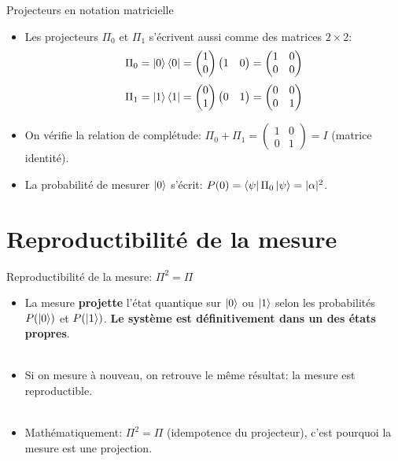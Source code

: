 \documentclass[aspectratio=169,12pt]{beamer}
\begin{document}
\begin{frame}{Projecteurs en notation matricielle}
  \begin{itemize}[<+->]
    \setlength{\itemsep}{0.6em}
    \item Les projecteurs $\Pi_0$ et $\Pi_1$ s'écrivent aussi comme des matrices $2\times 2$:
    $$\Pi_0 = \ket{0}\bra{0} =
      \begin{pmatrix}1\\0\end{pmatrix}\begin{pmatrix}1 & 0\end{pmatrix}
      = \begin{pmatrix}1 & 0\\0 & 0\end{pmatrix}$$
    $$\Pi_1 = \ket{1}\bra{1} =
      \begin{pmatrix}0\\1\end{pmatrix}\begin{pmatrix}0 & 1\end{pmatrix}
      = \begin{pmatrix}0 & 0\\0 & 1\end{pmatrix}$$
    \item On vérifie la relation de complétude:
    $\Pi_0 + \Pi_1 = \begin{pmatrix}1 & 0\\0 & 1\end{pmatrix} = I$ (matrice identité).
    \item La probabilité de mesurer $\ket{0}$ s'écrit:
    $P(0) = \bra{\psi}\Pi_0\ket{\psi} = |\alpha|^2$.
  \end{itemize}
\end{frame}

\section{Reproductibilité de la mesure}

\begin{frame}{Reproductibilité de la mesure: $\Pi^2 = \Pi$}
  \begin{itemize}[<+->]
    \setlength{\itemsep}{0.8em}
    \item La mesure \textbf{projette} l'état quantique sur $\ket{0}$ ou $\ket{1}$
     selon les probabilités $P(\ket 0)$ et $P(\ket 1)$. \textbf{Le système est définitivement dans un des états propres}.\\~\\
    \item Si on mesure à nouveau, on retrouve le même résultat: la mesure est reproductible.\\~\\
    \item Mathématiquement: $\Pi^2 = \Pi$ (idempotence du projecteur), c'est pourquoi la mesure est une projection.
  \end{itemize}
\end{frame}
\end{document}

